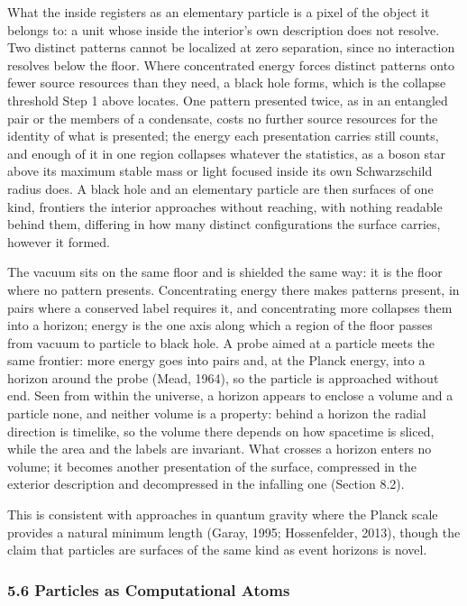\documentclass[
]{article}
\begin{document}
What the inside registers as an elementary particle is a pixel of the
object it belongs to: a unit whose inside the interior's own description
does not resolve. Two distinct patterns cannot be localized at zero
separation, since no interaction resolves below the floor. Where
concentrated energy forces distinct patterns onto fewer source resources
than they need, a black hole forms, which is the collapse threshold Step
1 above locates. One pattern presented twice, as in an entangled pair or
the members of a condensate, costs no further source resources for the
identity of what is presented; the energy each presentation carries
still counts, and enough of it in one region collapses whatever the
statistics, as a boson star above its maximum stable mass or light
focused inside its own Schwarzschild radius does. A black hole and an
elementary particle are then surfaces of one kind, frontiers the
interior approaches without reaching, with nothing readable behind them,
differing in how many distinct configurations the surface carries,
however it formed.

The vacuum sits on the same floor and is shielded the same way: it is
the floor where no pattern presents. Concentrating energy there makes
patterns present, in pairs where a conserved label requires it, and
concentrating more collapses them into a horizon; energy is the one axis
along which a region of the floor passes from vacuum to particle to
black hole. A probe aimed at a particle meets the same frontier: more
energy goes into pairs and, at the Planck energy, into a horizon around
the probe (Mead, 1964), so the particle is approached without end. Seen
from within the universe, a horizon appears to enclose a volume and a
particle none, and neither volume is a property: behind a horizon the
radial direction is timelike, so the volume there depends on how
spacetime is sliced, while the area and the labels are invariant. What
crosses a horizon enters no volume; it becomes another presentation of
the surface, compressed in the exterior description and decompressed in
the infalling one (Section 8.2).

This is consistent with approaches in quantum gravity where the Planck
scale provides a natural minimum length (Garay, 1995; Hossenfelder,
2013), though the claim that particles are surfaces of the same kind as
event horizons is novel.

\hypertarget{particles-as-computational-atoms}{%
\subsubsection{5.6 Particles as Computational
Atoms}\label{particles-as-computational-atoms}}
\end{document}
